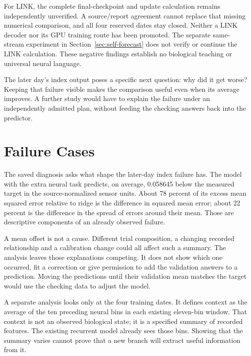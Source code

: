 For LINK, the complete final-checkpoint and update calculation remains independently unverified. A source/report agreement cannot replace that missing numerical comparison, and all four reserved dates stay closed. Neither a LINK decoder nor its GPU training route has been promoted. The separate same-stream experiment in Section~\ref{sec:self-forecast} does not verify or continue the LINK calculation. These negative findings establish no biological teaching or universal neural language.

\begingroup
{}
The later day's index output poses a specific next question: why did it get
worse? Keeping that failure visible makes the comparison useful even when its
average improves. A further study would have to explain the failure under an
independently admitted plan, without feeding the checking answers back into
the predictor.
\par
\endgroup

\section{Failure Cases}

The saved diagnosis asks what shape the later-day index failure has. The model
with the extra neural task predicts, on average, 0.058645 below the measured
target in the source-normalized sensor units. About 78 percent of its excess
mean squared error relative to ridge is the difference in squared mean error;
about 22 percent is the difference in the spread of errors around their mean.
Those are descriptive components of an already observed failure.

A mean offset is not a cause. Different trial composition, a changing recorded
relationship and a calibration change could all affect such a summary. The
analysis leaves those explanations competing. It does not show which one
occurred, fit a correction or give permission to add the validation answers
to a prediction. Moving the predictions until their validation mean matches
the target would use the checking data to adjust the model.

A separate analysis looks only at the four training dates. It defines context
as the average of the ten preceding neural bins in each existing eleven-bin
window. That context is not an observed biological state; it is a specified
summary of recorded features. The existing recurrent model already sees those
bins. Showing that the summary varies cannot prove that a new branch will
extract useful information from it.

